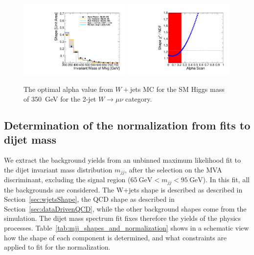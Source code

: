 %
\begin{figure}[!t]
  \centering
  \includegraphics[width=0.49\textwidth]{plots/anaexample/2j350mu-Alpha-mcget-MVAgt_60_Range_12_300-780_SB_55-65_95-200.pdf}
  \includegraphics[width=0.49\textwidth]{plots/anaexample/2j350mu-Alpha-mcsca-MVAgt_60_Range_12_300-780_SB_55-65_95-200.pdf}
  \caption{\label{fig:mcalphacheck_2j350mu}The optimal alpha value
    from $W+$jets MC for the SM Higgs mass of 350~GeV for the 2-jet
    $W\to\mu\nu$ category.}
\end{figure}
%

\subsection{Determination of the normalization from fits to dijet mass}
\label{sec:mjjfitfornormal}

We extract the background yields from an unbinned maximum likelihood
fit to the dijet invariant mass distribution $m_{jj}$, after the selection on the MVA discriminant,
excluding the signal region ($65~{\mbox{GeV}} < m_{jj} < 95~{\mbox{GeV}}$). 
In this fit, all the backgrounds are considered. 
The W+jets shape is described as described in Section~\ref{sec:wjetsShape},
the QCD shape as described in Section~\ref{sec:dataDrivenQCD}, 
while the other background shapes come from the simulation.
The dijet mass spectrum fit fixes therefore the yields of the physics processes. 
Table~\ref{tab:mjj_shapes_and_normalization} shows in a schematic view how the 
shape of each component is determined, and what constraints 
are applied to fit for the normalization. 

